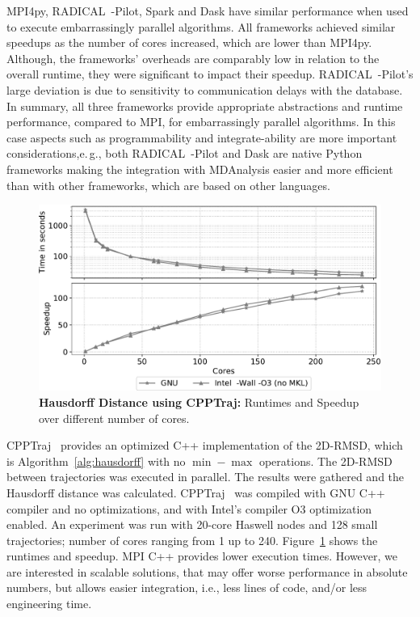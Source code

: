 MPI4py, RADICAL~-Pilot, Spark and Dask have similar performance when used to execute embarrassingly parallel algorithms.
All frameworks achieved similar speedups as the number of cores increased, which are lower than MPI4py.
Although, the frameworks' overheads are comparably low in relation to the overall runtime, they were significant to impact their speedup.
RADICAL~-Pilot's large deviation is due to sensitivity to communication delays with the database.
In summary, all three frameworks provide appropriate abstractions and runtime performance, compared to MPI, for embarrassingly parallel algorithms. 
In this case aspects such as programmability and integrate-ability are more important considerations,e.\,g., both RADICAL~-Pilot and Dask are native Python frameworks making the integration with MDAnalysis easier and more efficient than with other frameworks, which are based on other languages.

\begin{figure}[ht]
    \centering
    \includegraphics[width=.95\textwidth]{figures/data_analytics_hpc/task_par/cpptrajHausdorff.pdf}
    \caption{\label{fig:cpptraj_resutls}\textbf{Hausdorff Distance using CPPTraj:}
    Runtimes and Speedup over different number of cores.} 
\end{figure}

CPPTraj~\cite{roe2018parallelization} provides an optimized C++ implementation of the 2D-RMSD, which is Algorithm~\ref{alg:hausdorff} with no $\min-\max$ operations.
The 2D-RMSD between trajectories was executed in parallel.
The results were gathered and the Hausdorff distance was calculated.
CPPTraj~\cite{roe2018parallelization} was compiled with GNU C++ compiler and no optimizations, and with Intel's compiler O3 optimization enabled.
An experiment was run with 20-core Haswell nodes and 128 small trajectories; number of cores ranging from 1 up to 240.
Figure~\ref{fig:cpptraj_resutls} shows the runtimes and speedup.
MPI C++ provides lower execution times.
However, we are interested in scalable solutions, that may offer worse performance in absolute numbers, but allows easier integration, i.e., less lines of code, and/or less engineering time.

